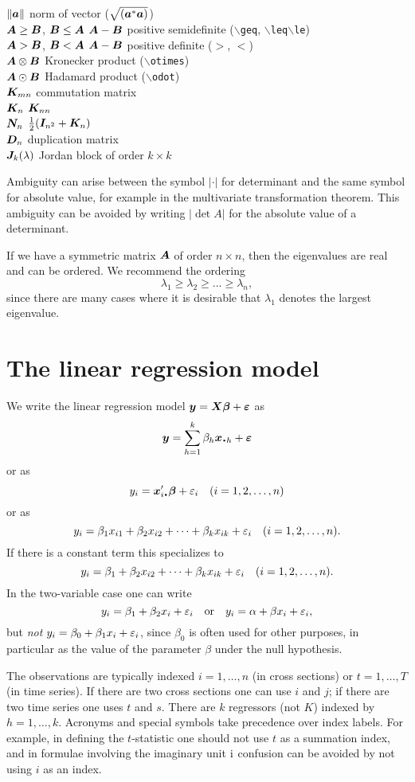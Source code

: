 \documentclass[11pt,dvips,a4paper]{article}
\newcommand{\type}[1]{{\tt$\backslash$#1}}
\begin{document}
\begin{tabbing}
$\|\bm a\|$ \> norm of vector ($\sqrt{(\bm a^*\bm a)}$)\\
$\bm A\geq \bm B$, $\bm B\leq \bm A$ \> $\bm A-\bm B$ positive semidefinite
(\type{geq}, \type{leq}\type{le})\\
$\bm A>\bm B$, $\bm B<\bm A$ \> $\bm A-\bm B$ positive definite ($>$, $<$)\\
$\bm A\otimes\bm B$ \> Kronecker product (\type{otimes})  \\
$\bm A\odot\bm B$ \> Hadamard product (\type{odot})\\
$\bm K_{mn}$ \> commutation matrix    \\
$\bm K_n$ \> $\bm K_{nn}$ \\
$\bm N_n$ \> $\frac{1}{2}(\bm I_{n^2}+\bm K_n)$   \\
$\bm D_n$ \> duplication matrix    \\
$\bm J_{k}(\lambda)$ \> Jordan block of order $k\times k$
\end{tabbing}
Ambiguity can arise between the symbol $|\cdot|$ for determinant and
the same symbol for absolute value, for example in the
multivariate transformation theorem.
This ambiguity can be avoided by writing $|\det A|$
for the absolute value of a determinant.

If we have a symmetric matrix $\bm A$ of order $n\times n$, then
the eigenvalues are real and can be ordered.
We recommend the ordering
$$
\lambda_1\geq\lambda_2\geq\dots\geq\lambda_n,
$$
since there are many cases where it is desirable that
$\lambda_1$ denotes the largest eigenvalue.
%
\section{The linear regression model}
We write the linear regression model
$\bm y=\bm X\bm \beta +\bm {\varepsilon}$
as
$$
\vy=\sum_{h=1}^k \beta_h \vx_{\bcdot h} + \vepsi
$$
or as
$$
y_i = \vx'_{i\bcdot}\vbeta + \epsi_i\quad (i=1,2,\dots,n)
$$
or as
$$
y_i = \beta_1 x_{i1} + \beta_2 x_{i2} + \dots + \beta_k x_{ik} + \varepsilon_i\quad (i=1,2,\dots,n).
$$
If there is a constant term this specializes to
$$
y_i = \beta_1 + \beta_2 x_{i2} + \dots + \beta_k x_{ik} + \varepsilon_i\quad (i=1,2,\dots,n).
$$
In the two-variable case one can write
$$
y_i = \beta_1 + \beta_2 x_{i} + \varepsilon_i
\quad
\text{or}
\quad
y_i = \alpha + \beta x_{i} + \varepsilon_i,
$$
but {\it not\/}
$y_i = \beta_0 + \beta_1 x_{i} + \varepsilon_i$,
since $\beta_0$ is often used for other purposes,
in particular as the value of the parameter
$\beta$ under the null hypothesis.

The observations are typically indexed $i=1,\dots,n$ (in cross sections) or
$t=1,\dots,T$ (in time series). If there are two cross sections one can
use $i$ and $j$; if there are two time series one uses $t$ and $s$.
There are $k$ regressors (not $K$) indexed by $h=1,\dots,k$.
Acronyms and special symbols take precedence over index labels.
For example, in defining the $t$-statistic one should not
use $t$ as a summation index, and in formulae involving the imaginary unit
$\mathrm{i}$ confusion can be avoided by not using $i$ as an index.
\end{document}
